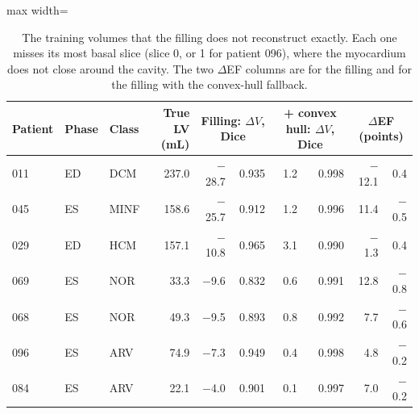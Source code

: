 \begin{table}[H]
\centering
\scriptsize
\setlength{\tabcolsep}{4pt}
\begin{adjustbox}{max width=\linewidth}
\begin{tabular}{lllrrrrrrr}
\toprule
Patient & Phase & Class & True LV (mL) & \multicolumn{2}{c}{Filling: $\Delta V$, Dice} & \multicolumn{2}{c}{+ convex hull: $\Delta V$, Dice} & \multicolumn{2}{c}{$\Delta$EF (points)} \\
\midrule
011 & ED & DCM & 237.0 & $-$28.7 & 0.935 & 1.2 & 0.998 & $-$12.1 & 0.4 \\
045 & ES & MINF & 158.6 & $-$25.7 & 0.912 & 1.2 & 0.996 & 11.4 & $-$0.5 \\
029 & ED & HCM & 157.1 & $-$10.8 & 0.965 & 3.1 & 0.990 & $-$1.3 & 0.4 \\
069 & ES & NOR & 33.3 & $-$9.6 & 0.832 & 0.6 & 0.991 & 12.8 & $-$0.8 \\
068 & ES & NOR & 49.3 & $-$9.5 & 0.893 & 0.8 & 0.992 & 7.7 & $-$0.6 \\
096 & ES & ARV & 74.9 & $-$7.3 & 0.949 & 0.4 & 0.998 & 4.8 & $-$0.2 \\
084 & ES & ARV & 22.1 & $-$4.0 & 0.901 & 0.1 & 0.997 & 7.0 & $-$0.2 \\
\bottomrule
\end{tabular}
\end{adjustbox}
\caption{The training volumes that the filling does not reconstruct exactly. Each one misses its most basal slice (slice 0, or 1 for patient 096), where the myocardium does not close around the cavity. The two $\Delta$EF columns are for the filling and for the filling with the convex-hull fallback.}
\label{tab:supp-lv}
\end{table}
